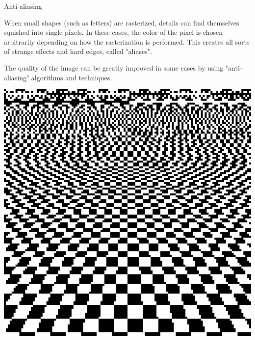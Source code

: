 \documentclass{lug}
\newcommand{\splitslide}[4]{
    \noindent
    \begin{minipage}{#1 \textwidth - #2 }
        #3
    \end{minipage}%
    \hspace{ \dimexpr #2 * 2 \relax }%
    \begin{minipage}{\textwidth - #1 \textwidth - #2 }
        #4
    \end{minipage}
}
\begin{document}
\begin{frame}{Anti-aliasing}
    \splitslide{0.65}{.7em}{
        \small

        When small shapes (such as letters) are rasterized, details can find
        themselves squished into single pixels. In these cases, the color of
        the pixel is chosen arbitrarily depending on how the rasterization is
        performed. This creates all sorts of strange effects and hard edges,
        called "aliases".

        \vspace{1ex}

        The quality of the image can be greatly improved in some cases by
        using "anti-aliasing" algorithms and techniques.

    }{
        \includegraphics[width=\textwidth]{graphics/aliased} \\
}
\end{frame}
\end{document}
